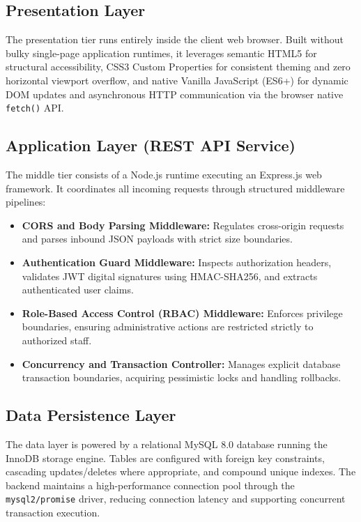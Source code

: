 \documentclass[11pt,a4paper]{report}
\begin{document}
\subsection{Presentation Layer}
The presentation tier runs entirely inside the client web browser. Built without bulky single-page application runtimes, it leverages semantic HTML5 for structural accessibility, CSS3 Custom Properties for consistent theming and zero horizontal viewport overflow, and native Vanilla JavaScript (ES6+) for dynamic DOM updates and asynchronous HTTP communication via the browser native \texttt{fetch()} API.

\subsection{Application Layer (REST API Service)}
The middle tier consists of a Node.js runtime executing an Express.js web framework. It coordinates all incoming requests through structured middleware pipelines:
\begin{itemize}[leftmargin=1.5em, itemsep=0.3em]
    \item \textbf{CORS and Body Parsing Middleware:} Regulates cross-origin requests and parses inbound JSON payloads with strict size boundaries.
    \item \textbf{Authentication Guard Middleware:} Inspects authorization headers, validates JWT digital signatures using HMAC-SHA256, and extracts authenticated user claims.
    \item \textbf{Role-Based Access Control (RBAC) Middleware:} Enforces privilege boundaries, ensuring administrative actions are restricted strictly to authorized staff.
    \item \textbf{Concurrency and Transaction Controller:} Manages explicit database transaction boundaries, acquiring pessimistic locks and handling rollbacks.
\end{itemize}

\subsection{Data Persistence Layer}
The data layer is powered by a relational MySQL 8.0 database running the InnoDB storage engine. Tables are configured with foreign key constraints, cascading updates/deletes where appropriate, and compound unique indexes. The backend maintains a high-performance connection pool through the \texttt{mysql2/promise} driver, reducing connection latency and supporting concurrent transaction execution.
\end{document}
